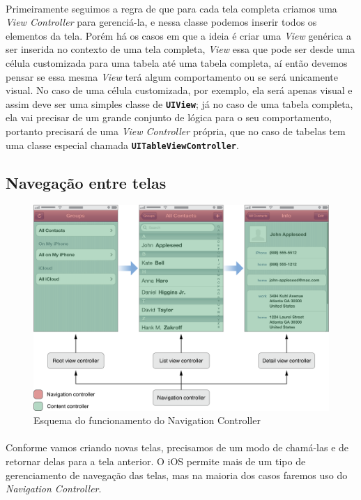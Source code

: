 \documentclass[a4paper,12pt,brazil,doubleside]{book}
\begin{document}
\paragraph{}Primeiramente seguimos a regra de que para cada tela completa criamos uma \emph{View Controller} para gerenciá-la, e nessa classe podemos inserir todos os elementos da tela. Porém há os casos em que a ideia é criar uma \emph{View} genérica a ser inserida no contexto de uma tela completa, \emph{View} essa que pode ser desde uma célula customizada para uma tabela até uma tabela completa, aí então devemos pensar se essa mesma \emph{View} terá algum comportamento ou se será unicamente visual. No caso de uma célula customizada, por exemplo, ela será apenas visual e assim deve ser uma simples classe de \texttt{\textbf{UIView}}; já no caso de uma tabela completa, ela vai precisar de um grande conjunto de lógica para o seu comportamento, portanto precisará de uma \emph{View Controller} própria, que no caso de tabelas tem uma classe especial chamada \texttt{\textbf{UITableViewController}}.

\subsection{Navegação entre telas}

\begin{figure}[h]
  \centering
  \includegraphics[totalheight=0.35\textheight]{figuras/apple_navigation_interface.png}
  \caption{Esquema do funcionamento do Navigation Controller}
  \label{fig:a}
\end{figure}

\paragraph{}Conforme vamos criando novas telas, precisamos de um modo de chamá-las e de retornar delas para a tela anterior. O iOS permite mais de um tipo de gerenciamento de navegação das telas, mas na maioria dos casos faremos uso do \emph{Navigation Controller}.
\end{document}

